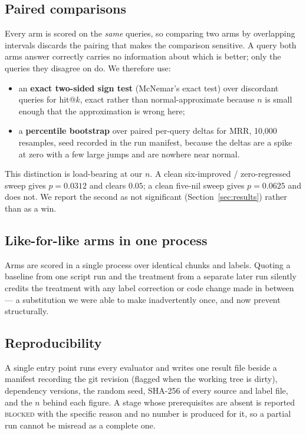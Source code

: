 \documentclass[conference]{IEEEtran}
\begin{document}
\subsection{Paired comparisons}

Every arm is scored on the \emph{same} queries, so comparing two arms by
overlapping intervals discards the pairing that makes the comparison sensitive.
A query both arms answer correctly carries no information about which is better;
only the queries they disagree on do. We therefore use:

\begin{itemize}
  \item an \textbf{exact two-sided sign test} (McNemar's exact test) over
  discordant queries for hit@$k$, exact rather than normal-approximate because
  $n$ is small enough that the approximation is wrong here;
  \item a \textbf{percentile bootstrap} over paired per-query deltas for MRR,
  10{,}000 resamples, seed recorded in the run manifest, because the deltas are
  a spike at zero with a few large jumps and are nowhere near normal.
\end{itemize}

This distinction is load-bearing at our $n$. A clean six-improved /
zero-regressed sweep gives $p=0.0312$ and clears $0.05$; a clean five-nil sweep
gives $p=0.0625$ and does not. We report the second as not significant
(Section~\ref{sec:results}) rather than as a win.

\subsection{Like-for-like arms in one process}

Arms are scored in a single process over identical chunks and labels. Quoting a
baseline from one script run and the treatment from a separate later run silently
credits the treatment with any label correction or code change made in between
--- a substitution we were able to make inadvertently once, and now prevent
structurally.

\subsection{Reproducibility}

A single entry point runs every evaluator and writes one result file beside a
manifest recording the git revision (flagged when the working tree is dirty),
dependency versions, the random seed, SHA-256 of every source and label file,
and the $n$ behind each figure. A stage whose prerequisites are absent is
reported \textsc{blocked} with the specific reason and no number is produced for
it, so a partial run cannot be misread as a complete one.
\end{document}
